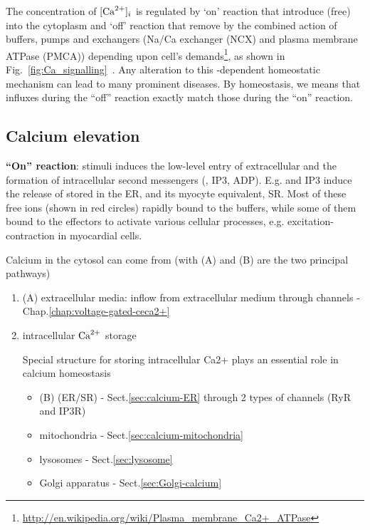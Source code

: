 \begin{framed}
  The concentration of $[\ce{Ca^2+}]_i$ is regulated by `on' reaction
  that introduce (free)  into the cytoplasm and `off' reaction
  that remove  by the combined action of buffers, pumps and
  exchangers (Na/Ca exchanger (NCX) and plasma membrane 
  ATPase (PMCA)) depending upon cell's
  demands\footnote{\url{http://en.wikipedia.org/wiki/Plasma_membrane_Ca2+_ATPase}},
  as shown in Fig.~\ref{fig:Ca_signalling}~\citep{berridge2003csd}. Any
  alteration to this -dependent homeostatic mechanism can lead
  to many prominent diseases.  By  homeostasis, we means that
   influxes during the ``off'' reaction exactly match those
  during the ``on'' reaction.

\end{framed}

\subsection{Calcium elevation}

{\bf ``On'' reaction}: stimuli induces the low-level entry of extracellular
 and the formation of intracellular second messengers (,
IP3, ADP). E.g.  and IP3 induce the release of  stored in
the ER, and its myocyte equivalent, SR. Most of these free ions (shown in red
circles) rapidly bound to the buffers, while some of them bound to the effectors
to activate various cellular processes, e.g. excitation-contraction in
myocardial cells.

Calcium in the cytosol can come from (with (A) and (B) are the two principal
pathways)
\begin{enumerate}
  \item (A) extracellular media: inflow from extracellular medium through
   channels - Chap.\ref{chap:voltage-gated-ceca2+}
  
  \item intracellular ${\text{Ca}^{2+}}$ storage 

Special structure for storing intracellular Ca2+ plays an essential role in
calcium homeostasis
  \begin{itemize}
    \item (B) (ER/SR)  - Sect.\ref{sec:calcium-ER} through 2 types of 
    channels (RyR and IP3R)
  
    \item mitochondria - Sect.\ref{sec:calcium-mitochondria}
  
    \item lysosomes - Sect.\ref{sec:lysosome}
  
    \item Golgi apparatus - Sect.\ref{sec:Golgi-calcium}

  \end{itemize}
\end{enumerate}


